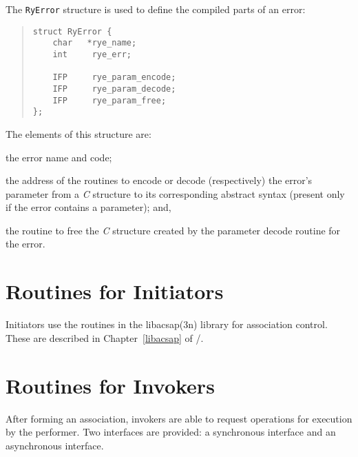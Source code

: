 The \verb"RyError" structure is used to define the compiled parts of an
error:
\begin{quote}\small{}\begin{verbatim}
struct RyError {
    char   *rye_name;
    int     rye_err;

    IFP     rye_param_encode;
    IFP     rye_param_decode;
    IFP     rye_param_free;
};
\end{verbatim}\end{quote}
The elements of this structure are:
\begin{describe}
\item[\verb"rye\_name"/\verb"rye\_err":] the error name and code;

\item[\verb"rye\_param\_encode"/\verb"rye\_res\_decode":] the address of the
routines to encode or decode (respectively) the error's parameter from a
{\em C\/} structure to its corresponding abstract syntax
(present only if the error contains a parameter);
and,

\item[\verb"ryo\_param\_free":] the routine to free the {\em C\/} structure
created by the parameter decode routine for the error.
\end{describe}

\section	{Routines for Initiators}
Initiators use the routines in the \man libacsap(3n) library for association
control.
These are described in Chapter~\ref{libacsap} of \volone/.

\section	{Routines for Invokers}\label{ryoperation}
After forming an association,
invokers are able to request operations for execution by the performer.
Two interfaces are provided:
a synchronous interface and an asynchronous interface.

